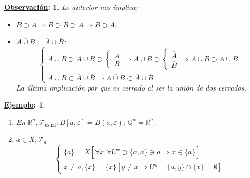 \documentclass[10pt,a4paper,openright]{book}
\theoremstyle{break}
\newtheorem*{obs}{\underline{Observación}:}
\newtheorem*{ej}{\underline{Ejemplo}:}
\begin{document}
\begin{obs}
Lo anterior nos implica:
\begin{itemize}
    \item $B \supset A \Rightarrow \overline{B} \supset B \supset A \Rightarrow \overline{B} \supset \overline{A}$.
    \item $\overline{A \cup B} = \overline{A} \cup \overline{B}$:
    \[
    \begin{cases}
        \overline{A\cup B} \supset A \cup B \supset \begin{cases}
            A\\B
        \end{cases} \Rightarrow \overline{A\cup B} \supset \begin{cases}
            \overline{A} \\ \overline{B} 
        \end{cases} \Rightarrow \overline{A\cup B} \supset \overline{A} \cup \overline{B}\\

        A \cup B \subset \overline{A} \cup \overline{B} \Rightarrow \overline{A\cup B} \subset \overline{A} \cup \overline{B} 
    \end{cases} 
    \]
    La última implicación por que es cerrado al ser la unión de dos cerrados.
\end{itemize}
\end{obs}

\begin{ej}
\begin{enumerate}
    \item En $\mathbb{R}^n, \mathcal{T}_{\text{usual}}: B\left[ a, \varepsilon \right] = \overline{B \left( a, \varepsilon \right)};\ \overline{\mathbb{Q}^n} = \mathbb{R}^n$.
    \item $a \in X, \mathcal{T}_a$
    \[
        \begin{cases}
        \overline{\{a\}} = X \left[ \forall x, \forall U^x \supset \{a, x\} \ni a \Rightarrow x \in \overline{\{a\}} \right]\\
        x \neq a, \overline{\{x\}} = \{x\} \left[ y\neq x \Rightarrow U^y = \{a, y\} \cap \{x\} = \emptyset \right] 
        \end{cases} 
    \]
\end{enumerate}
\end{ej}
\end{document}
